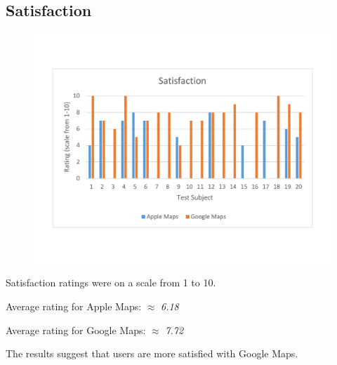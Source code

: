 \documentclass[a4paper; 11pt]{article}
\begin{document}
\subsection{Satisfaction}
\begin{figure}[htbp]
\begin{center}
\vspace{-.4in}
\includegraphics[keepaspectratio, width=.8\textwidth ]{satisfaction.pdf}
\end{center}
\end{figure}
\vspace{-.6in}
\par
Satisfaction ratings were on a scale from 1 to 10.
\par
Average rating for Apple Maps: $ \approx $ \textit{6.18}
\par
Average rating for Google Maps: $ \approx $ \textit{7.72}
\par
The results suggest that users are more satisfied with Google Maps.
\clearpage
\end{document}
